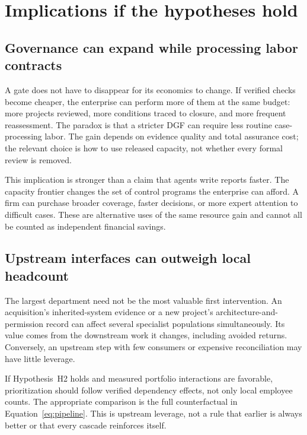 \section{Implications if the hypotheses hold}
\label{sec:implications}

\subsection{Governance can expand while processing labor contracts}

A gate does not have to disappear for its economics to change. If verified checks become cheaper, the
enterprise can perform more of them at the same budget: more projects reviewed, more conditions
traced to closure, and more frequent reassessment. The paradox is that a stricter DGF can require
less routine case-processing labor. The gain depends on evidence quality and total assurance cost;
the relevant choice is how to use released capacity, not whether every formal review is removed.

This implication is stronger than a claim that agents write reports faster. The capacity frontier
changes the set of control programs the enterprise can afford. A firm can purchase broader coverage,
faster decisions, or more expert attention to difficult cases. These are alternative uses of the same
resource gain and cannot all be counted as independent financial savings.

\subsection{Upstream interfaces can outweigh local headcount}

The largest department need not be the most valuable first intervention. An acquisition's
inherited-system evidence or a new project's architecture-and-permission record can affect several
specialist populations simultaneously. Its value comes from the downstream work it changes, including
avoided returns. Conversely, an upstream step with few consumers or expensive reconciliation may
have little leverage.

If Hypothesis~H2 holds and measured portfolio interactions are favorable, prioritization should follow
verified dependency effects, not only local employee counts. The appropriate comparison is the full
counterfactual in Equation~\eqref{eq:pipeline}. This is upstream leverage, not a rule that earlier is
always better or that every cascade reinforces itself.

